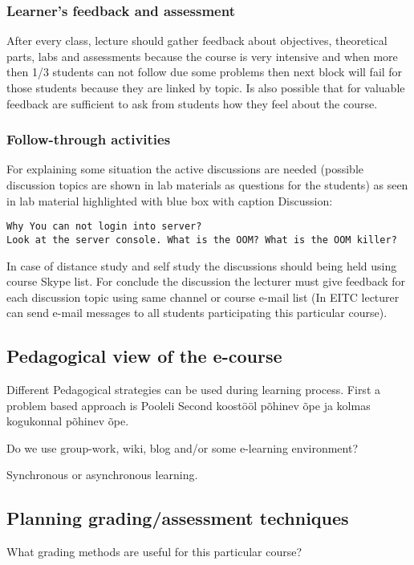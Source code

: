 \subsubsection{Learner's feedback and assessment}
After every class, lecture should gather feedback about objectives, theoretical parts, labs and assessments because the course is very intensive and when more then 1/3 students can not follow due some problems then next block will fail for those students because they are linked by topic.
Is also possible that for valuable feedback are sufficient to ask from students how they feel about the course.

\subsubsection{Follow-through activities}
For explaining some situation the active discussions are needed (possible discussion topics are shown in lab materials as questions for the students) as seen in lab material highlighted with blue box with caption Discussion:
\begin{Verbatim}[frame=single,
label=Discussion,framesep=2mm,rulecolor=\color{blue},commandchars=\\\{\}]
Why You can not login into server?
Look at the server console. What is the OOM? What is the OOM killer?
\end{Verbatim}
In case of distance study and self study the discussions should being held using course Skype list. For conclude the discussion the lecturer must give feedback for each discussion topic using same channel or course e-mail list (In \gls{EITC} lecturer can send e-mail messages to all students participating this particular course).



\subsection{Pedagogical view of the e-course}
Different Pedagogical strategies can be used during learning process. First a problem based approach is {\color{red} Pooleli }
Second koostööl põhinev õpe ja kolmas kogukonnal põhinev õpe.

Do we use group-work, wiki, blog and/or some e-learning environment?

Synchronous or asynchronous learning.

\subsection{Planning grading/assessment techniques}
What grading methods are useful for this particular course?

